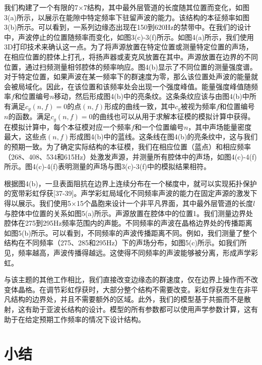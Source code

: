我们构建了一个有限的7×7结构，其中最外层管道的长度随其位置而变化，如图3(a)所示，以展示在能隙中特定频率下驻留声波的能力。该结构的本征频率如图3(b)所示。可以看到，一系列边缘态出现在150到620Hz的禁带中。在我们的设计中，声波停止的位置随频率而变化，如图3(c)-3(f)所示。如图4(a)所示，我们使用3D打印技术来确认这一点。为了将声源放置在特定位置或测量特定位置的声场，在相应位置的腔体上打孔，将扬声器或麦克风放置在其中。声源放置在边界的不同位置，通过扫频测量相邻腔体的频率响应。图4(b)显示了不同位置的测量强度谱。对于特定位置，如果声波在某一频率下的群速度为零，那么该位置处声波的能量就会被局域化。因此，在该位置和该频率处会出现一个强度峰值。能量强度峰值随频率$f$和位置编号$n$移动，然后形成图4(b)中的亮条纹。这条条纹应该与由图4(b)中所有满足$c_g(n,f)=0$的点$(n,f)$形成的曲线一致，其中$c_g$被视为频率$f$和位置编号$n$的函数。满足$c_g(n,f)=0$的曲线也可以从用于求解本征模的模拟计算中获得。在模拟计算中，每个本征模对应一个频率$f$和一个位置编号$n$，其中声场能量密度最大，这些点$(n,f)$形成图4(b)中的蓝线。这条线在图4(b)的亮条纹中，这与我们的预期一致。为了确定实际结构的本征模，我们在相应位置（蓝点）和相应频率（268、408、534和615Hz）处激发声源，并测量所有腔体中的声场，如图4(c)-4(f)所示。图4(c)-4(f)表明测量的声场与图3(c)-3(f)中的模拟结果相符。

根据图4(b)，一旦表面阻抗在边界上连续分布在一个梯度中，就可以实现拓扑保护的宽带彩虹俘获[37-39]。声学彩虹局域化不同频率声波的能力在固定声源的激发下得以展示。我们使用5×15个晶胞来设计一个非平凡界面，其中最外层管道的长度$l$与腔体中位置的关系如图5(a)所示。声源放置在腔体中的位置1。我们测量边界处腔体在275到295Hz频率范围内的声能。不同频率的声波在晶格边界处的传播距离如图5(b)所示。可以看到，不同频率的声波传播距离不同。例如，我们测量了整个结构在不同频率（275、285和295Hz）下的声场分布，如图5(c)所示。如我们所见，频率越高，声波传播得越远。这使得不同频率的声波能够被分离，形成声学彩虹。

与该主题的其他工作相比，我们直接改变边缘态的群速度，仅在边界上操作而不改变体晶格。在调节彩虹俘获时，大部分整个结构不需要改变。彩虹俘获发生在非平凡结构的边界处，并且不需要额外的区域。此外，我们的模型基于共振而不是散射，这有助于亚波长结构的设计。模型的所有参数都可以使用声学参数计算，这有助于在给定预期工作频率的情况下设计结构。

\section{小结}